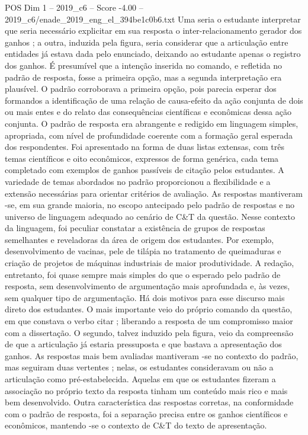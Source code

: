 \begin{textsample}{POS Dim 1 – 2019\_c6 – Score -4.00 – 2019\_c6/enade\_2019\_eng\_el\_394be1c0b6.txt}
Uma seria o estudante interpretar que seria necessário explicitar em sua resposta o inter-relacionamento gerador dos ganhos ; a outra, induzida pela figura, seria considerar que a articulação entre entidades já estava dada pelo enunciado, deixando ao estudante apenas o registro dos ganhos.
É presumível que a intenção inserida no comando, e refletida no padrão de resposta, fosse a primeira opção, mas a segunda interpretação era plausível.
O padrão corroborava a primeira opção, pois parecia esperar dos formandos a identificação de uma relação de causa-efeito da ação conjunta de dois ou mais entes e do relato das consequências científicas e econômicas dessa ação conjunta.
O padrão de resposta era abrangente e redigido em linguagem simples, apropriada, com nível de profundidade coerente com a formação geral esperada dos respondentes.
Foi apresentado na forma de duas listas extensas, com três temas científicos e oito econômicos, expressos de forma genérica, cada tema completado com exemplos de ganhos passíveis de citação pelos estudantes.
A variedade de temas abordados no padrão proporcionou a flexibilidade e a extensão necessárias para orientar critérios de avaliação.
As respostas mantiveram -se, em sua grande maioria, no escopo antecipado pelo padrão de respostas e no universo de linguagem adequado ao cenário de C\&T da questão.
Nesse contexto da linguagem, foi peculiar constatar a existência de grupos de respostas semelhantes e reveladoras da área de origem dos estudantes.
Por exemplo, desenvolvimento de vacinas, pele de tilápia no tratamento de queimaduras e criação de projetos de máquinas industriais de maior produtividade.
A redação, entretanto, foi quase sempre mais simples do que o esperado pelo padrão de resposta, sem desenvolvimento de argumentação mais aprofundada e, às vezes, sem qualquer tipo de argumentação.
Há dois motivos para esse discurso mais direto dos estudantes.
O mais importante veio do próprio comando da questão, em que constava o verbo citar ; liberando a resposta de um compromisso maior com a dissertação.
O segundo, talvez induzido pela figura, veio da compreensão de que a articulação já estaria pressuposta e que bastava a apresentação dos ganhos.
As respostas mais bem avaliadas mantiveram -se no contexto do padrão, mas seguiram duas vertentes ; nelas, os estudantes consideravam ou não a articulação como pré-estabelecida.
Aquelas em que os estudantes fizeram a associação no próprio texto da resposta tinham um conteúdo mais rico e mais bem desenvolvido.
Outra característica das respostas corretas, na conformidade com o padrão de resposta, foi a separação precisa entre os ganhos científicos e econômicos, mantendo -se o contexto de C\&T do texto de apresentação.

\end{textsample}
